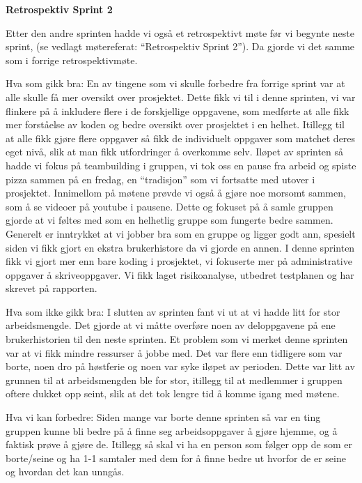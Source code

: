 \documentclass[12pt,a4paper,norsk]{article}
\begin{document}
\bigskip \noindent \textbf{Retrospektiv Sprint 2}
\par Etter den andre sprinten hadde vi også et retrospektivt møte før vi begynte neste sprint, (se vedlagt møtereferat: “Retrospektiv Sprint 2”). Da gjorde vi det samme som i forrige retrospektivmøte.

Hva som gikk bra:
En av tingene som vi skulle forbedre fra forrige sprint var at alle skulle få mer oversikt over prosjektet. Dette fikk vi til i denne sprinten, vi var flinkere på å inkludere flere i de forskjellige oppgavene, som medførte at alle fikk mer forståelse av koden og bedre oversikt over prosjektet i en helhet. Itillegg til at alle fikk gjøre flere oppgaver så fikk de individuelt oppgaver som matchet deres eget nivå, slik at man fikk utfordringer å overkomme selv.
Iløpet av sprinten så hadde vi fokus på teambuilding i gruppen, vi tok oss en pause fra arbeid og spiste pizza sammen på en fredag, en “tradisjon” som vi fortsatte med utover i prosjektet. Innimellom på møtene prøvde vi også å gjøre noe morsomt sammen, som å se videoer på youtube i pausene. Dette og fokuset på å samle gruppen gjorde at vi føltes med som en helhetlig gruppe som fungerte bedre sammen. 
Generelt er inntrykket at vi jobber bra som en gruppe og ligger godt ann, spesielt siden vi fikk gjort en ekstra brukerhistore da vi gjorde en annen. 
I denne sprinten fikk vi gjort mer enn bare koding i prosjektet, vi fokuserte mer på administrative oppgaver å skriveoppgaver. Vi fikk laget risikoanalyse, utbedret testplanen og har skrevet på rapporten. 

Hva som ikke gikk bra:
I slutten av sprinten fant vi ut at vi hadde litt for stor arbeidsmengde. Det gjorde at vi måtte overføre noen av deloppgavene på ene brukerhistorien til den neste sprinten. 
Et problem som vi merket denne sprinten var at vi fikk mindre ressurser å jobbe med. Det var flere enn tidligere som var borte, noen dro på høstferie og noen var syke iløpet av perioden. Dette var litt av grunnen til at arbeidsmengden ble for stor, itillegg til at medlemmer i gruppen oftere dukket opp seint, slik at det tok lengre tid å komme igang med møtene. 

Hva vi kan forbedre:
Siden mange var borte denne sprinten så var en ting gruppen kunne bli bedre på å finne seg arbeidsoppgaver å gjøre hjemme, og å faktisk prøve å gjøre de.
Itillegg så skal vi ha en person som følger opp de som er borte/seine og ha 1-1 samtaler med dem for å finne bedre ut hvorfor de er seine og hvordan det kan unngås. 
\end{document}
